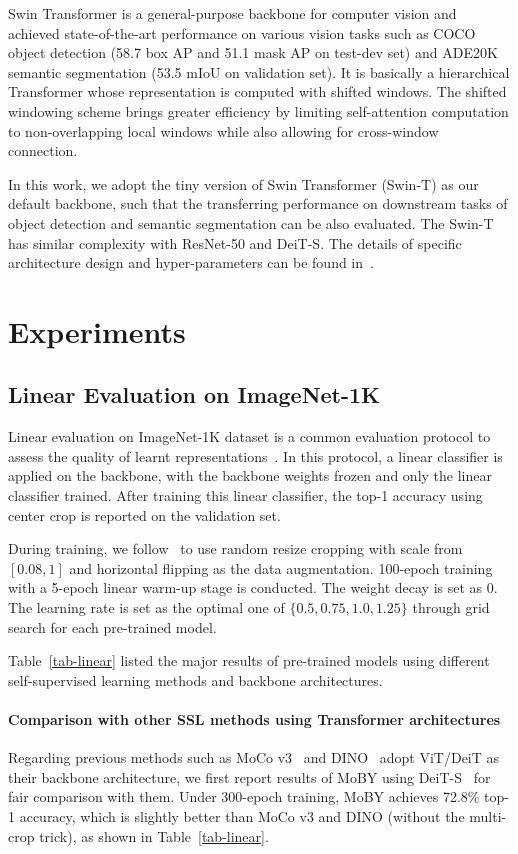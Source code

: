 \documentclass{article}
\begin{document}
Swin Transformer is a general-purpose backbone for computer vision and achieved state-of-the-art performance on various vision tasks such as COCO object detection (58.7 box AP and 51.1 mask AP on test-dev set) and ADE20K semantic segmentation (53.5 mIoU on validation set). It is basically a hierarchical Transformer whose representation is computed with shifted windows. The shifted windowing scheme brings greater efficiency by limiting self-attention computation to non-overlapping local windows while also allowing for cross-window connection.

In this work, we adopt the tiny version of Swin Transformer (Swin-T) as our default backbone, such that the transferring performance on downstream tasks of object detection and semantic segmentation can be also evaluated. The Swin-T has similar complexity with ResNet-50 and DeiT-S. The details of specific architecture design and hyper-parameters can be found in~\citep{swin}.

\section{Experiments}

\subsection{Linear Evaluation on ImageNet-1K}
Linear evaluation on ImageNet-1K dataset is a common evaluation protocol to assess the quality of learnt representations~\citep{moco}. In this protocol, a linear classifier is applied on the backbone, with the backbone weights frozen and only the linear classifier trained. After training this linear classifier, the top-1 accuracy using center crop is reported on the validation set.

During training, we follow~\citep{moco} to use random resize cropping with scale from $[0.08, 1]$ and horizontal flipping as the data augmentation. 100-epoch training with a 5-epoch linear warm-up stage is conducted. The weight decay is set as 0. The learning rate is set as the optimal one of $\{0.5, 0.75, 1.0, 1.25\}$ through grid search for each pre-trained model.

Table~\ref{tab-linear} listed the major results of pre-trained models using different self-supervised learning methods and backbone architectures.

\paragraph{Comparison with other SSL methods using Transformer architectures} Regarding previous methods such as MoCo v3~\citep{mocov3} and DINO~\citep{dino} adopt ViT/DeiT as their backbone architecture, we first report results of MoBY using DeiT-S~\citep{deit} for fair comparison with them. Under 300-epoch training, MoBY achieves 72.8\% top-1 accuracy, which is slightly better than MoCo v3 and DINO (without the multi-crop trick), as shown in Table~\ref{tab-linear}. 
\end{document}
